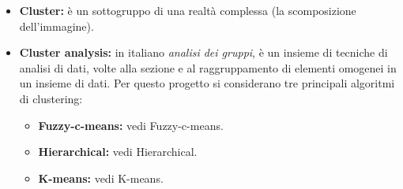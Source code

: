\begin{itemize}
\item\textbf{Cluster:} è un sottogruppo di una realtà complessa (la scomposizione dell'immagine).

\item\textbf{Cluster analysis:} in italiano \textit{analisi dei gruppi}, è un insieme di tecniche di analisi di dati, volte alla sezione e al raggruppamento di elementi omogenei in un insieme di dati. Per questo progetto si considerano tre principali algoritmi di clustering\glossario{}:
	\begin{itemize}
	\item \textbf{Fuzzy-c-means:} vedi Fuzzy-c-means\glossario{}.
	
	\item \textbf{Hierarchical:} vedi Hierarchical\glossario{}.

	\item \textbf{K-means:} vedi K-means\glossario{}.
	\end{itemize}
\end{itemize}
\pagebreak

